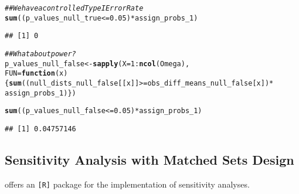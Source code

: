 \documentclass[11pt,leqno]{article}\usepackage[]{graphicx}\usepackage[]{color}
\makeatletter
\newcommand{\hlnum}[1]{\textcolor[rgb]{0.686,0.059,0.569}{#1}}%
\newcommand{\hlcom}[1]{\textcolor[rgb]{0.678,0.584,0.686}{\textit{#1}}}%
\newcommand{\hlopt}[1]{\textcolor[rgb]{0,0,0}{#1}}%
\newcommand{\hlstd}[1]{\textcolor[rgb]{0.345,0.345,0.345}{#1}}%
\newcommand{\hlkwa}[1]{\textcolor[rgb]{0.161,0.373,0.58}{\textbf{#1}}}%
\newcommand{\hlkwb}[1]{\textcolor[rgb]{0.69,0.353,0.396}{#1}}%
\newcommand{\hlkwc}[1]{\textcolor[rgb]{0.333,0.667,0.333}{#1}}%
\newcommand{\hlkwd}[1]{\textcolor[rgb]{0.737,0.353,0.396}{\textbf{#1}}}%
\newenvironment{kframe}{%
 \def\at@end@of@kframe{}%
 \ifinner\ifhmode%
  \def\at@end@of@kframe{\end{minipage}}%
  \begin{minipage}{\columnwidth}%
 \fi\fi%
 \def\FrameCommand##1{\hskip\@totalleftmargin \hskip-\fboxsep
 \colorbox{shadecolor}{##1}\hskip-\fboxsep
     \hskip-\linewidth \hskip-\@totalleftmargin \hskip\columnwidth}%
 \MakeFramed {\advance\hsize-\width
   \@totalleftmargin\z@ \linewidth\hsize
   \@setminipage}}%
 {\par\unskip\endMakeFramed%
 \at@end@of@kframe}
\newenvironment{knitrout}{}{} %
\theoremstyle{newstyle}
\makeatother
\begin{document}
\begin{knitrout}
\begin{kframe}
\begin{alltt}
\hlcom{## We have a controlled Type I Error Rate}
\hlkwd{sum}\hlstd{((p_values_null_true} \hlopt{<=} \hlnum{0.05}\hlstd{)} \hlopt{*} \hlstd{assign_probs_1)}
\end{alltt}
\begin{verbatim}
## [1] 0
\end{verbatim}
\begin{alltt}
\hlcom{## What about power?}
\hlstd{p_values_null_false} \hlkwb{<-} \hlkwd{sapply}\hlstd{(}\hlkwc{X} \hlstd{=} \hlnum{1}\hlopt{:}\hlkwd{ncol}\hlstd{(Omega),}
                              \hlkwc{FUN} \hlstd{=} \hlkwa{function}\hlstd{(}\hlkwc{x}\hlstd{) \{} \hlkwd{sum}\hlstd{((null_dists_null_false[[x]]} \hlopt{>=} \hlstd{obs_diff_means_null_false[x])} \hlopt{*}
                                                        \hlstd{assign_probs_1) \})}


\hlkwd{sum}\hlstd{((p_values_null_false} \hlopt{<=} \hlnum{0.05}\hlstd{)} \hlopt{*} \hlstd{assign_probs_1)}
\end{alltt}
\begin{verbatim}
## [1] 0.04757146
\end{verbatim}
\end{kframe}
\end{knitrout}

\subsection{Sensitivity Analysis with Matched Sets Design}

\citet{rosenbaum2015} offers an \texttt{[R]} package for the implementation of sensitivity analyses.
\end{document}
